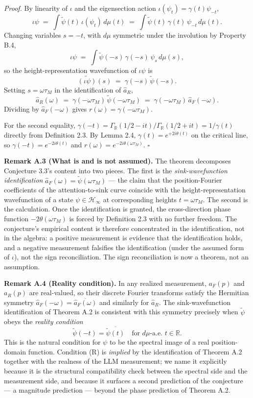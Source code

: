 \documentclass[
  letterpaper,
  11pt]{article}
\theoremstyle{plain}
\theoremstyle{definition}
\theoremstyle{remark}
\begin{document}
\emph{Proof.} By linearity of \(\iota\) and the eigensection action \(\iota(\psi_t) = \gamma(t)\psi_{-t}\),
\[\iota\psi \;=\; \int \tilde\psi(t)\,\iota(\psi_t)\,d\mu(t) \;=\; \int \tilde\psi(t)\,\gamma(t)\,\psi_{-t}\,d\mu(t).\]
Changing variables \(s = -t\), with \(d\mu\) symmetric under the involution by Property B.4,
\[\iota\psi \;=\; \int \tilde\psi(-s)\,\gamma(-s)\,\psi_s\,d\mu(s),\]
so the height-representation wavefunction of \(\iota\psi\) is
\[\widetilde{(\iota\psi)}(s) \;=\; \gamma(-s)\,\tilde\psi(-s).\]
Setting \(s = \omega\tau_M\) in the identification of \(\hat a_R\),
\[\hat a_R(\omega) \;=\; \gamma(-\omega\tau_M)\,\tilde\psi(-\omega\tau_M) \;=\; \gamma(-\omega\tau_M)\,\hat a_F(-\omega).\]
Dividing by \(\hat a_F(-\omega)\) gives \(r(\omega) = \gamma(-\omega\tau_M)\).

For the second equality, \(\gamma(-t) = \Gamma_{\mathbb{R}}(1/2 - it)/\Gamma_{\mathbb{R}}(1/2 + it) = 1/\gamma(t)\) directly from Definition 2.3. By Lemma 2.4, \(\gamma(t) = e^{+2i\theta(t)}\) on the critical line, so \(\gamma(-t) = e^{-2i\theta(t)}\) and \(r(\omega) = e^{-2i\theta(\omega\tau_M)}\). \(\square\)

\textbf{Remark A.3 (What is and is not assumed).} The theorem decomposes Conjecture 3.3's content into two pieces. The first is the \emph{sink-wavefunction identification} \(\hat a_F(\omega) = \tilde\psi(\omega\tau_M)\) --- the claim that the position-Fourier coefficients of the attention-to-sink curve coincide with the height-representation wavefunction of a state \(\psi \in \mathcal{H}_\infty\) at corresponding heights \(t = \omega\tau_M\). The second is the calculation. Once the identification is granted, the cross-direction phase function \(-2\theta(\omega\tau_M)\) is forced by Definition 2.3 with no further freedom. The conjecture's empirical content is therefore concentrated in the identification, not in the algebra: a positive measurement is evidence that the identification holds, and a negative measurement falsifies the identification (under the assumed form of \(\iota\)), not the sign reconciliation. The sign reconciliation is now a theorem, not an assumption.

\textbf{Remark A.4 (Reality condition).} In any realized measurement, \(a_F(p)\) and \(a_R(p)\) are real-valued, so their discrete Fourier transforms satisfy the Hermitian symmetry \(\hat a_F(-\omega) = \overline{\hat a_F(\omega)}\) and similarly for \(\hat a_R\). The sink-wavefunction identification of Theorem A.2 is consistent with this symmetry precisely when \(\tilde\psi\) obeys the \emph{reality condition}
\[\tilde\psi(-t) = \overline{\tilde\psi(t)} \quad \text{for } d\mu\text{-a.e. } t \in \mathbb{R}. \tag{R}\]
This is the natural condition for \(\psi\) to be the spectral image of a real position-domain function. Condition (R) is \emph{implied} by the identification of Theorem A.2 together with the realness of the LLM measurement; we name it explicitly because it is the structural compatibility check between the spectral side and the measurement side, and because it surfaces a second prediction of the conjecture --- a magnitude prediction --- beyond the phase prediction of Theorem A.2.
\end{document}
